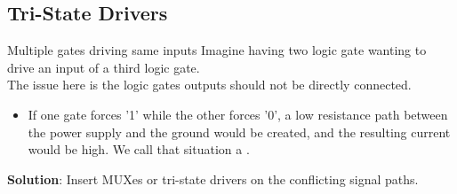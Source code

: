\subsection{Tri-State Drivers}
\begin{parag}{Multiple gates driving same inputs}
    Imagine having two logic gate wanting to drive an input of a third logic gate.\\
    The issue here is the logic gates outputs should not be directly connected.
    \begin{itemize}
        \item If one gate forces '1' while the other forces '0', a low resistance path between the power supply and the ground would be created, and the resulting current would be high. We call that situation a .
    \end{itemize}
    \textbf{Solution}: Insert MUXes or tri-state drivers on the conflicting signal paths.
\end{parag}
